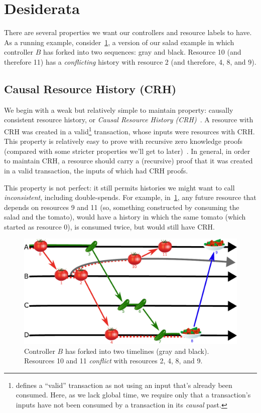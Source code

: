 \documentclass[a4paper,USenglish,cleveref, autoref, thm-restate, anonymous]{lipics-v2021}
\begin{document}
\section{Desiderata}
There are several properties we want our controllers and resource labels to have.
As a running example, consider~\cref{fig:saladfork}, a version of our salad example in which controller $B$ has forked into two sequences: gray and black. 
Resource 10 (and therefore 11) has a \emph{conflicting} history with resource 2 (and therefore, 4, 8, and 9).


\subsection{Causal Resource History (CRH)}
We begin with a weak but relatively simple to maintain property: causally consistent resource history, or \emph{Causal Resource History (CRH)}~\cite{causal}.
A resource with CRH was created in a valid\footnote{\cite{resource} defines a ``valid'' transaction as not using an input that's already been consumed.
Here, as we lack global time, we require only that a transaction's inputs have not been consumed by a transaction in its \textit{causal} past.}
transaction, whose inputs were resources with CRH. 
This property is relatively easy to prove with recursive zero knowledge proofs (compared with some stricter properties we'll get to later)~\cite{nova}.
In general, in order to maintain CRH, a resource should carry a (recursive) proof that it was created in a valid transaction, the inputs of which had CRH proofs. 

This property is not perfect: it still permits histories we might want to call \emph{inconsistent}, including double-spends.
For example, in~\cref{fig:saladfork}, any future resource that depends on resources 9 and 11 (so, something constructed by consuming the salad and the tomato), would have a history in which the same tomato (which started as resource 0), is consumed twice, but would still have CRH.



\begin{figure}
    \centering
    \centerline{
    \includegraphics[width=0.85\linewidth]{figs/salad_timeline_fork.pdf}
    }
    \caption{Controller $B$ has forked into two timelines (gray and black).
             Resources 10 and 11 \emph{conflict} with resources 2, 4, 8, and 9.}
    \label{fig:saladfork}
\end{figure}
\end{document}

